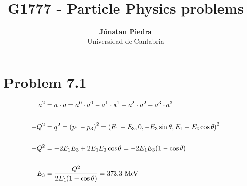 \documentclass[11pt]{article}
\begin{document}
\title{\bf G1777 - Particle Physics problems} 
\author{
  {\bf J\'onatan Piedra}\\
  Universidad de Cantabria}
\maketitle


\section{Problem 7.1}

\begin{align*}
  a^2 &= a \cdot a = a^0 \cdot a^0 - a^1 \cdot a^1 - a^2 \cdot a^2 - a^3 \cdot a^3\\
  ~\\
  -Q^2 &= q^2 = \left(p_1 - p_3\right)^2 = \left(E_1 - E_3, 0, -E_3\sin\theta, E_1 - E_3\cos\theta\right)^2\\
  ~\\
  -Q^2 &= -2E_1E_3 + 2E_1E_3\cos\theta = -2E_1 E_3(1 - \cos\theta)\\
  ~\\
  E_3 &= \frac{Q^2}{2E_1(1 - \cos\theta)} = 373.3~{\rm MeV}
\end{align*}
\end{document}
